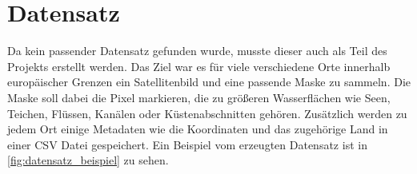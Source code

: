 \section{Datensatz}
\label{sec:Datensatz}

Da kein passender Datensatz gefunden wurde, musste dieser auch als Teil des Projekts erstellt werden.
Das Ziel war es für viele verschiedene Orte innerhalb europäischer Grenzen ein Satellitenbild und eine passende Maske zu sammeln.
Die Maske soll dabei die Pixel markieren, die zu größeren Wasserflächen wie Seen, Teichen, Flüssen, Kanälen oder Küstenabschnitten gehören.
Zusätzlich werden zu jedem Ort einige Metadaten wie die Koordinaten und das zugehörige Land in einer CSV Datei gespeichert.
Ein Beispiel vom erzeugten Datensatz ist in \autoref{fig:datensatz_beispiel} zu sehen.

